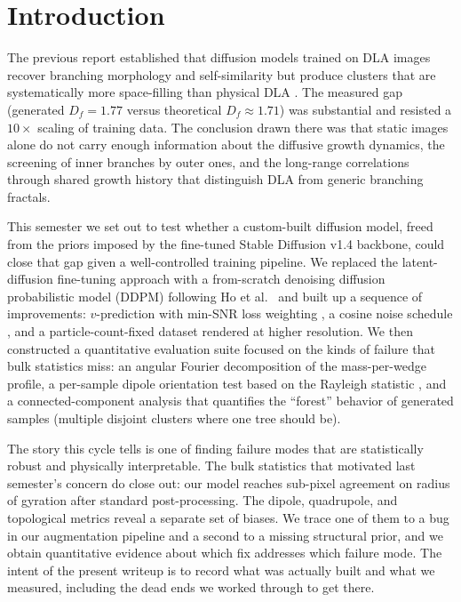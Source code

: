 \documentclass[11pt]{article}
\begin{document}
\section{Introduction}

The previous report \cite{desouza2026learning} established that diffusion models trained on DLA images recover branching morphology and self-similarity but produce clusters that are systematically more space-filling than physical DLA \cite{wittensander1981, meakin1998}. The measured gap (generated $D_f = 1.77$ versus theoretical $D_f \approx 1.71$) was substantial and resisted a $10\times$ scaling of training data. The conclusion drawn there was that static images alone do not carry enough information about the diffusive growth dynamics, the screening of inner branches by outer ones, and the long-range correlations through shared growth history that distinguish DLA from generic branching fractals.

This semester we set out to test whether a custom-built diffusion model, freed from the priors imposed by the fine-tuned Stable Diffusion v1.4 backbone, could close that gap given a well-controlled training pipeline. We replaced the latent-diffusion fine-tuning approach with a from-scratch denoising diffusion probabilistic model (DDPM) following Ho et al.\ \cite{ho2020ddpm} and built up a sequence of improvements: $v$-prediction with min-SNR loss weighting \cite{salimans2022progressive, hang2023efficient}, a cosine noise schedule \cite{nichol2021improved}, and a particle-count-fixed dataset rendered at higher resolution. We then constructed a quantitative evaluation suite focused on the kinds of failure that bulk statistics miss: an angular Fourier decomposition of the mass-per-wedge profile, a per-sample dipole orientation test based on the Rayleigh statistic \cite{fisher1995statistical}, and a connected-component analysis that quantifies the ``forest'' behavior of generated samples (multiple disjoint clusters where one tree should be).

The story this cycle tells is one of finding failure modes that are statistically robust and physically interpretable. The bulk statistics that motivated last semester's concern do close out: our model reaches sub-pixel agreement on radius of gyration after standard post-processing. The dipole, quadrupole, and topological metrics reveal a separate set of biases. We trace one of them to a bug in our augmentation pipeline and a second to a missing structural prior, and we obtain quantitative evidence about which fix addresses which failure mode. The intent of the present writeup is to record what was actually built and what we measured, including the dead ends we worked through to get there.
\end{document}
